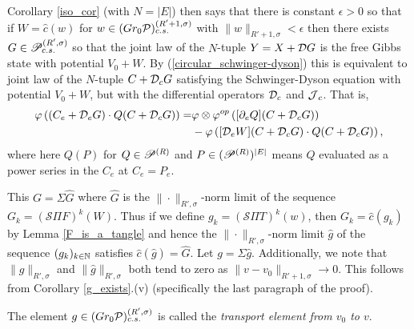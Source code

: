 Corollary \ref{iso_cor} (with $N=|E|$) then says that there is constant $\epsilon>0$ so that if $W=\hat{c}(w)$ for $w\in (Gr_0\mc{P})^{(R'+1,\sigma)}_{c.s.}$ with $\|w\|_{R'+1,\sigma}<\epsilon$ then there exists $G\in \P^{(R',\sigma)}_{c.s.}$ so that the joint law of the $N$-tuple $Y=X+\D G$ is the free Gibbs state with potential $V_0+W$. By (\ref{circular_schwinger-dyson}) this is equivalent to joint law of the $N$-tuple $C+\D_c G$ satisfying the Schwinger-Dyson equation with potential $V_0+W$, but with the differential operators $\D_c$ and $\J_c$. That is,
\begin{align}\label{translated_S-D}
\varphi\left((C_e+\D_e G)\cdot Q(C+\D_c G)\right)=& \varphi\otimes\varphi^{op}\left([\partial_e Q](C+\D_c G)\right)\nonumber\\
&-\varphi\left([\D_e W](C+\D_c G)\cdot Q(C+\D_c G)\right),
\end{align}
where here $Q(P)$ for $Q\in \P^{(R)}$ and $P\in(\P^{(R)})^{|E|}$ means $Q$ evaluated as a power series in the $C_e$ at $C_e=P_e$.

This $G=\Sigma \hat{G}$ where $\hat{G}$ is the $\|\cdot\|_{R',\sigma}$-norm limit of the sequence $G_k=(\mathscr{S}\Pi F)^k(W)$. Thus if we define $g_k=(\mathscr{S}\Pi T)^k(w)$, then $G_k=\hat{c}(g_k)$ by Lemma \ref{F_is_a_tangle} and hence the $\|\cdot\|_{R',\sigma}$-norm limit $\hat{g}$ of the sequence $(g_k)_{k\in \N}$ satisfies $\hat{c}(\hat{g})=\hat{G}$. Let $g=\Sigma \hat{g}$. Additionally, we note that $\|g\|_{R',\sigma}$ and $\|\hat{g}\|_{R',\sigma}$ both tend to zero as $\|v-v_0\|_{R'+1,\sigma}\to 0$. This follows from Corollary \ref{g_exists}.(v) (specifically the last paragraph of the proof).

\begin{defi}
The element $g\in (Gr_0\mc{P})^{(R',\sigma)}_{c.s.}$ is called the \emph{transport element from $v_0$ to $v$}.
\end{defi}

